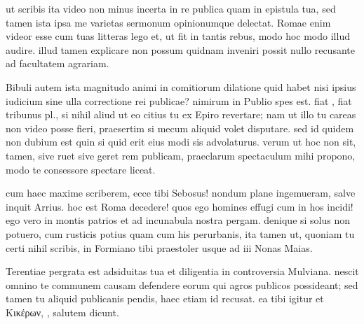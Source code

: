 


 ut scribis ita video non minus incerta in re publica quam in epistula tua, sed tamen ista ipsa me varietas sermonum opinionumque delectat. Romae enim videor esse cum tuas litteras lego et, ut fit in tantis rebus, modo hoc modo illud audire. illud tamen explicare non possum quidnam inveniri possit nullo recusante ad facultatem agrariam.

 Bibuli autem ista magnitudo animi in comitiorum dilatione quid habet nisi ipsius iudicium sine ulla correctione rei publicae? nimirum in Publio spes est. fiat , fiat tribunus pl., si nihil aliud ut eo citius tu ex Epiro revertare; nam ut illo tu careas non video posse fieri, praesertim si mecum aliquid volet disputare. sed id quidem non dubium est quin si quid erit eius modi sis advolaturus. verum ut hoc non sit, tamen, sive ruet sive geret rem publicam, praeclarum spectaculum mihi propono, modo te consessore spectare liceat.

 cum haec maxime scriberem, ecce tibi Sebosus! nondum plane ingemueram, salve inquit Arrius. hoc est Roma decedere! quos ego homines effugi cum in hos incidi! ego vero in montis patrios et ad incunabula nostra pergam. denique si solus non potuero, cum rusticis potius quam cum his perurbanis, ita tamen ut, quoniam tu certi nihil scribis, in Formiano tibi praestoler usque ad iii Nonas Maias.

 Terentiae pergrata est adsiduitas tua et diligentia in controversia Mulviana. nescit omnino te communem causam defendere eorum qui agros publicos possideant; sed tamen tu aliquid publicanis pendis, haec etiam id recusat. ea tibi igitur et Κικέρων, , salutem dicunt.
